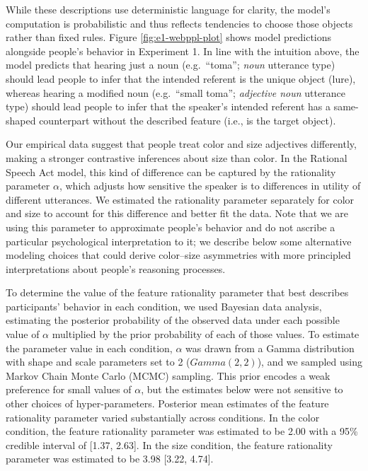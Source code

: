 \documentclass[
  english,
  man,floatsintext]{apa6}
\begin{document}
While these descriptions use deterministic language for clarity, the model's computation is probabilistic and thus reflects tendencies to choose those objects rather than fixed rules. Figure \ref{fig:e1-webppl-plot} shows model predictions alongside people's behavior in Experiment 1. In line with the intuition above, the model predicts that hearing just a noun (e.g.~``toma''; \emph{noun} utterance type) should lead people to infer that the intended referent is the unique object (lure), whereas hearing a modified noun (e.g.~``small toma''; \emph{adjective noun} utterance type) should lead people to infer that the speaker's intended referent has a same-shaped counterpart without the described feature (i.e., is the target object).

Our empirical data suggest that people treat color and size adjectives differently, making a stronger contrastive inferences about size than color. In the Rational Speech Act model, this kind of difference can be captured by the rationality parameter \(\alpha\), which adjusts how sensitive the speaker is to differences in utility of different utterances. We estimated the rationality parameter separately for color and size to account for this difference and better fit the data. Note that we are using this parameter to approximate people's behavior and do not ascribe a particular psychological interpretation to it; we describe below some alternative modeling choices that could derive color--size asymmetries with more principled interpretations about people's reasoning processes.

To determine the value of the feature rationality parameter that best describes participants' behavior in each condition, we used Bayesian data analysis, estimating the posterior probability of the observed data under each possible value of \(\alpha\) multiplied by the prior probability of each of those values. To estimate the parameter value in each condition, \(\alpha\) was drawn from a Gamma distribution with shape and scale parameters set to 2 (\(Gamma\left(2,2\right)\)), and we sampled using Markov Chain Monte Carlo (MCMC) sampling. This prior encodes a weak preference for small values of \(\alpha\), but the estimates below were not sensitive to other choices of hyper-parameters. Posterior mean estimates of the feature rationality parameter varied substantially across conditions. In the color condition, the feature rationality parameter was estimated to be 2.00 with a 95\% credible interval of {[}1.37, 2.63{]}. In the size condition, the feature rationality parameter was estimated to be 3.98 {[}3.22, 4.74{]}.
\end{document}
